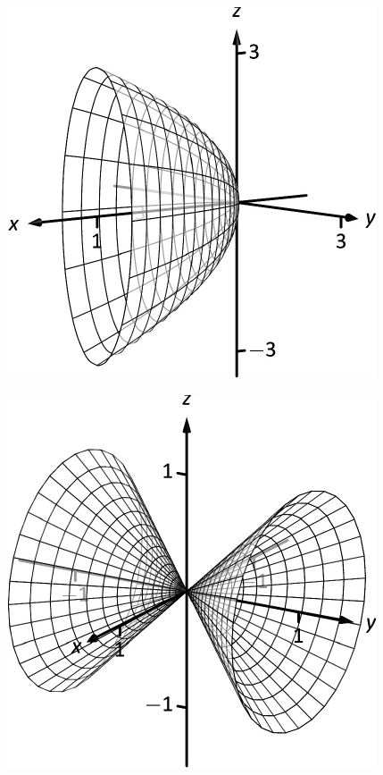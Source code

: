\documentclass[10pt]{article}
\begin{document}
\includegraphics{fig10_01_ex_19_3DBW.pdf}
\texttt{}

\includegraphics{fig10_01_ex_20_3DBW.pdf}
\texttt{}
\end{document}
